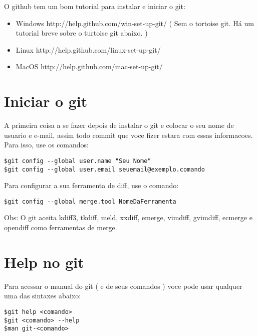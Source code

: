 \documentclass{article}
\begin{document}
	O github tem um bom tutorial para instalar e iniciar o git:
	\begin{itemize}
    \item Windows   http://help.github.com/win-set-up-git/ ( Sem o tortoise git. Há um
                    tutorial breve sobre o turtoise git abaixo. )
    \item Linux     http://help.github.com/linux-set-up-git/
    \item MacOS     http://help.github.com/mac-set-up-git/
    \end{itemize}
    
\section{Iniciar o git}
    A primeira coisa a se fazer depois de instalar o git e colocar o seu nome de
usuario e e-mail, assim todo commit que voce fizer estara com essas informacoes.
Para isso, use os comandos:

\begin{tabbing}
\hspace{1cm}\=   \verb#$git config --global user.name "Seu Nome"# \\
            \>   \verb#$git config --global user.email seuemail@exemplo.comando#
\end{tabbing}
    Para configurar a sua ferramenta de diff, use o comando:

\begin{tabbing}
\hspace{1cm}\=   \verb#$git config --global merge.tool NomeDaFerramenta#
\end{tabbing}

Obs: O git aceita kdiff3, tkdiff, meld, xxdiff, emerge, vimdiff, gvimdiff, ecmerge
e opendiff como ferramentas de merge.

\section{Help no git}
    Para acessar o manual do git ( e de seus comandos ) voce pode usar qualquer
uma das sintaxes abaixo:

\begin{tabbing}
\hspace{1cm}\=  \verb#$git help <comando>#\\
            \>  \verb#$git <comando> --help#\\
            \>  \verb#$man git-<comando>#
\end{tabbing}
\end{document}

